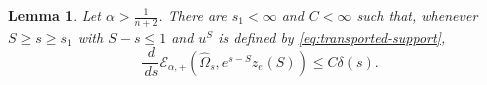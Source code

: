 \documentclass[11pt, reqno]{amsart}
\newtheorem{lemma}[theorem]{Lemma}
\theoremstyle{remark}
\theoremstyle{definition}
\numberwithin{equation}{section}
\newcommand{\Id}{\operatorname{Id}}
\newcommand{\dd}{\,d}
\begin{document}

\begin{lemma}
\label{lem:transported-entropy-alpha}
Let $\alpha > \frac{1}{n+2}$.  There are $s_1<\infty$ and $C<\infty$ such that, whenever $S\ge s\ge s_1$ with $S-s\leq 1$ and $u^{S}$ is defined by
\eqref{eq:transported-support},
\begin{equation}\label{eq:entropy-almost-monotone}
\frac{\dd}{\dd s}
\mathcal{E}_{\alpha,+}(\widehat\Omega_s,e^{s-S}z_e(S))
\le C\delta(s).
\end{equation}
\end{lemma}
\end{document}
